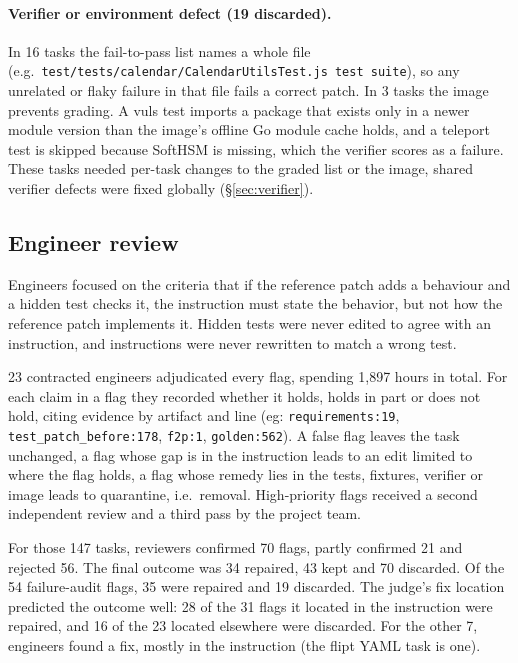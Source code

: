 \paragraph{Verifier or environment defect (19 discarded).}
In 16 tasks the fail-to-pass list names a whole file (e.g.\ \texttt{test/tests/calendar/\allowbreak CalendarUtilsTest.js \textbar{} test suite}), so any unrelated or flaky failure in that file fails a correct patch. In 3 tasks the image prevents grading. A vuls test imports a package that exists only in a newer module version than the image's offline Go module cache holds, and a teleport test is skipped because SoftHSM is missing, which the verifier scores as a failure. These tasks needed per-task changes to the graded list or the image, shared verifier defects were fixed globally (\S\ref{sec:verifier}).


\subsection{Engineer review}
\label{sec:review}

Engineers focused on the criteria that if the reference patch adds a behaviour and a hidden test checks it, the instruction must state the behavior, but not how the reference patch implements it. Hidden tests were never edited to agree with an instruction, and instructions were never rewritten to match a wrong test.

23 contracted engineers adjudicated every flag, spending 1{,}897 hours in total. For each claim in a flag they recorded whether it holds, holds in part or does not hold, citing evidence by artifact and line (eg: \texttt{requirements:19}, \texttt{test\_patch\_before:178}, \texttt{f2p:1}, \texttt{golden:562}). A false flag leaves the task unchanged, a flag whose gap is in the instruction leads to an edit limited to where the flag holds, a flag whose remedy lies in the tests, fixtures, verifier or image leads to quarantine, i.e.\ removal. High-priority flags received a second independent review and a third pass by the project team. %

For those 147 tasks, reviewers confirmed 70 flags, partly confirmed 21 and rejected 56. The final outcome was 34 repaired, 43 kept and 70 discarded. Of the 54 failure-audit flags, 35 were repaired and 19 discarded. The judge's fix location predicted the outcome well: 28 of the 31 flags it located in the instruction were repaired, and 16 of the 23 located elsewhere were discarded. For the other 7, engineers found a fix, mostly in the instruction (the flipt YAML task is one).

